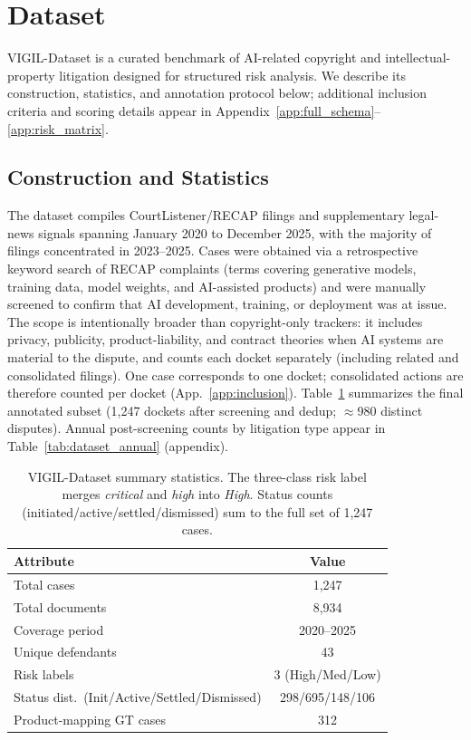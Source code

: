 \section{Dataset}
\label{sec:dataset}
VIGIL-Dataset is a curated benchmark of AI-related copyright and intellectual-property litigation designed for structured risk analysis. We describe its construction, statistics, and annotation protocol below; additional inclusion criteria and scoring details appear in Appendix~\ref{app:full_schema}--\ref{app:risk_matrix}.

\subsection{Construction and Statistics}
The dataset compiles CourtListener/RECAP filings and supplementary legal-news signals spanning January 2020 to December 2025, with the majority of filings concentrated in 2023--2025. Cases were obtained via a retrospective keyword search of RECAP complaints (terms covering generative models, training data, model weights, and AI-assisted products) and were manually screened to confirm that AI development, training, or deployment was at issue. The scope is intentionally broader than copyright-only trackers: it includes privacy, publicity, product-liability, and contract theories when AI systems are material to the dispute, and counts each docket separately (including related and consolidated filings). One case corresponds to one docket; consolidated actions are therefore counted per docket (App.~\ref{app:inclusion}). Table~\ref{tab:dataset_stats} summarizes the final annotated subset (1{,}247 dockets after screening and dedup; $\approx$980 distinct disputes). Annual post-screening counts by litigation type appear in Table~\ref{tab:dataset_annual} (appendix).

\begin{table}[t]
\centering
\caption{VIGIL-Dataset summary statistics. The three-class risk label merges \emph{critical} and \emph{high} into \emph{High}. Status counts (initiated/active/settled/dismissed) sum to the full set of 1{,}247 cases.}
\label{tab:dataset_stats}
\footnotesize
\setlength{\tabcolsep}{6pt}
\begin{tabular}{p{4.2cm} c}
\toprule
\textbf{Attribute} & \textbf{Value} \\
\midrule
Total cases & 1{,}247 \\
Total documents & 8{,}934 \\
Coverage period & 2020--2025 \\
Unique defendants & 43 \\
Risk labels & 3 (High/Med/Low) \\
Status dist.\ (Init/Active/Settled/Dismissed) & 298/695/148/106 \\
Product-mapping GT cases & 312 \\
\bottomrule
\end{tabular}
\end{table}


